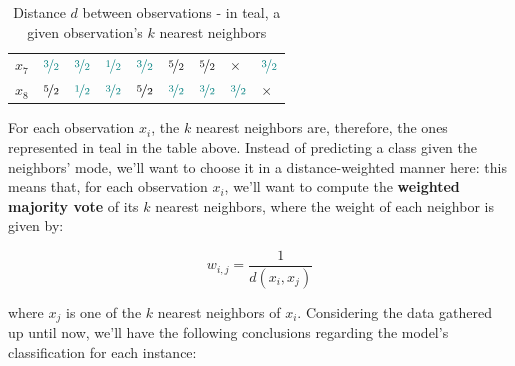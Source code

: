 \documentclass[12pt]{article}
\begin{document}
\begin{enumerate}[leftmargin=\labelsep]
\begin{table}[h]
\begin{tabular}{lllllllll}
    $x_7$ & $\textcolor{teal}{\nicefrac{3}{2}}$ & $\textcolor{teal}{\nicefrac{3}{2}}$ & $\textcolor{teal}{\nicefrac{1}{2}}$ & $\textcolor{teal}{\nicefrac{3}{2}}$ & $\nicefrac{5}{2}$                   & $\nicefrac{5}{2}$                   & $\times$                        & $\textcolor{teal}{\nicefrac{3}{2}}$ \\
    $x_8$ & $\nicefrac{5}{2}$                   & $\textcolor{teal}{\nicefrac{1}{2}}$ & $\textcolor{teal}{\nicefrac{3}{2}}$ & $\nicefrac{5}{2}$                   & $\textcolor{teal}{\nicefrac{3}{2}}$ & $\textcolor{teal}{\nicefrac{3}{2}}$ & $\textcolor{teal}{\nicefrac{3}{2}}$ & $\times$                       
    \end{tabular}
    \caption{Distance $d$ between observations - in teal, a given observation's $k$ nearest neighbors}
  \end{table}

  For each observation $x_i$, the $k$ nearest neighbors are, therefore, the ones represented in
  teal in the table above. Instead of predicting a class given the neighbors' mode,
  we'll want to choose it in a distance-weighted manner here: this means that, for each
  observation $x_i$, we'll want to compute the \textbf{weighted majority vote} of its $k$ nearest
  neighbors, where the weight of each neighbor is given by:

  $$w_{i, j} = \frac{1}{d(x_i, x_j)}$$

  where $x_j$ is one of the $k$ nearest neighbors of $x_i$. Considering the data gathered up until now,
  we'll have the following conclusions regarding the model's classification for each instance:


\end{enumerate}
\end{document}
